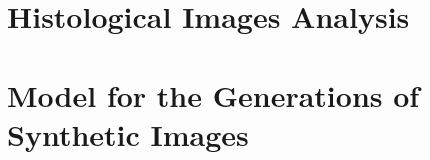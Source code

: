 \documentclass[12pt,a4paper]{report}
\begin{document}




\tableofcontents{}


\clearpage

\chapter{Histological Images Analysis}
    
    
    \clearpage
    
    \clearpage
    
    \clearpage

\chapter{Model for the Generations of Synthetic Images}
    
    
    \clearpage
    
    \clearpage
    
    \clearpage


\clearpage


\end{document}

